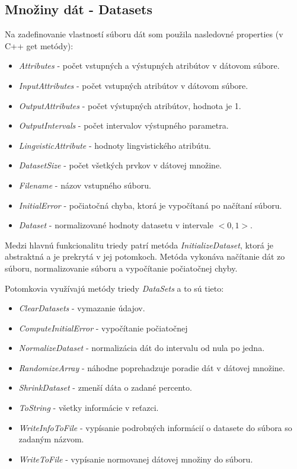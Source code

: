 \subsection{Množiny dát - Datasets}

Na zadefinovanie vlastností súboru dát som použila nasledovné properties (v C++ get metódy): 
\begin{itemize}
\item \textit{Attributes} - počet vstupných a výstupných atribútov v dátovom súbore. 
\item \textit{InputAttributes} - počet vstupných atribútov v dátovom súbore. 
\item \textit{OutputAttributes} - počet výstupných atribútov, hodnota je 1. 
\item \textit{OutputIntervals} - počet intervalov výstupného parametra. 
\item \textit{LingvisticAttribute} - hodnoty lingvistického atribútu.
\item \textit{DatasetSize} - počet všetkých prvkov v dátovej množine. 
\item \textit{Filename} - názov vstupného súboru. 
\item \textit{InitialError} - počiatočná chyba, ktorá je vypočítaná po načítaní súboru. 
\item \textit{Dataset} - normalizované hodnoty datasetu v intervale $<0,1>$. 
\end{itemize}

Medzi hlavnú funkcionalitu triedy patrí metóda \textit{InitializeDataset}, ktorá je abstraktná a je prekrytá v jej potomkoch. Metóda vykonáva načítanie dát zo súboru, normalizovanie súboru a vypočítanie počiatočnej chyby. 

Potomkovia využívajú metódy triedy \textit{DataSets} a to sú tieto: 
\begin{itemize}
\item \textit{ClearDatasets} - vymazanie údajov. 
\item \textit{ComputeInitialError} - vypočítanie počiatočnej 
\item \textit{NormalizeDataset} - normalizácia dát do intervalu od nula po jedna.
\item \textit{RandomizeArray} - náhodne poprehadzuje poradie dát v dátovej množine.
\item \textit{ShrinkDataset} - zmenší dáta o zadané percento.
\item \textit{ToString} - všetky informácie v reťazci. 
\item \textit{WriteInfoToFile} - vypísanie podrobných informácií o datasete do súbora so zadaným názvom. 
\item \textit{WriteToFile} - vypísanie normovanej dátovej množiny do súboru. 
\end{itemize}

